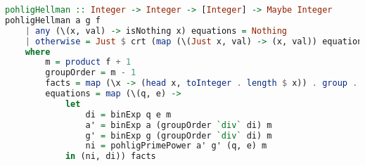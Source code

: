 \documentclass{article}
\begin{document}
\noindent\hspace{0.03\linewidth}
\begin{minipage}{.9\linewidth}
\begin{lstlisting}[language=haskell,caption=Pohlig Hellman]
pohligHellman :: Integer -> Integer -> [Integer] -> Maybe Integer
pohligHellman a g f
    | any (\(x, val) -> isNothing x) equations = Nothing
    | otherwise = Just $ crt (map (\(Just x, val) -> (x, val)) equations)
    where
        m = product f + 1
        groupOrder = m - 1
        facts = map (\x -> (head x, toInteger . length $ x)) . group . factorize $ groupOrder
        equations = map (\(q, e) ->
            let
                di = binExp q e m
                a' = binExp a (groupOrder `div` di) m
                g' = binExp g (groupOrder `div` di) m
                ni = pohligPrimePower a' g' (q, e) m
            in (ni, di)) facts
\end{lstlisting}
\end{minipage}
\end{document}
